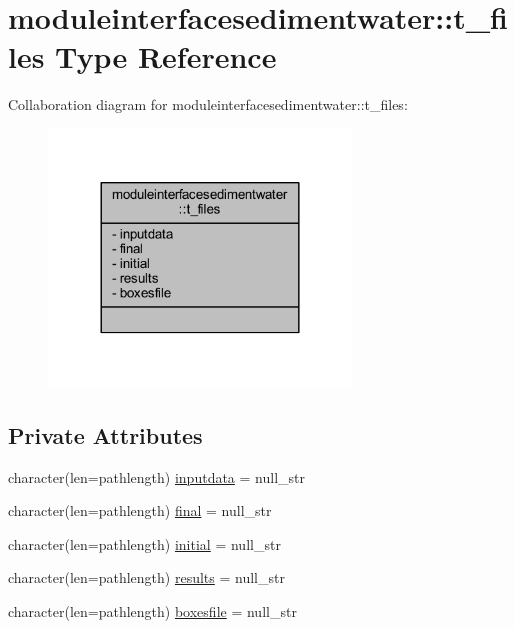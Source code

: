 \hypertarget{structmoduleinterfacesedimentwater_1_1t__files}{}\section{moduleinterfacesedimentwater\+:\+:t\+\_\+files Type Reference}
\label{structmoduleinterfacesedimentwater_1_1t__files}


Collaboration diagram for moduleinterfacesedimentwater\+:\+:t\+\_\+files\+:\nopagebreak
\begin{figure}[H]
\begin{center}
\leavevmode
\includegraphics[width=228pt]{structmoduleinterfacesedimentwater_1_1t__files__coll__graph}
\end{center}
\end{figure}
\subsection*{Private Attributes}
\begin{DoxyCompactItemize}
\item 
character(len=pathlength) \mbox{\hyperlink{structmoduleinterfacesedimentwater_1_1t__files_a0863fb6401802926bb1c729d95df47df}{inputdata}} = null\+\_\+str
\item 
character(len=pathlength) \mbox{\hyperlink{structmoduleinterfacesedimentwater_1_1t__files_a4539d8c564e231aae887ab3b7347708e}{final}} = null\+\_\+str
\item 
character(len=pathlength) \mbox{\hyperlink{structmoduleinterfacesedimentwater_1_1t__files_a06df41ee65cf1d8ec3695e1a50fcff9a}{initial}} = null\+\_\+str
\item 
character(len=pathlength) \mbox{\hyperlink{structmoduleinterfacesedimentwater_1_1t__files_abc4ad069042a82eac98587cb8b60711e}{results}} = null\+\_\+str
\item 
character(len=pathlength) \mbox{\hyperlink{structmoduleinterfacesedimentwater_1_1t__files_aab6401e4c633fdc02a345ba3fb80bdaf}{boxesfile}} = null\+\_\+str
\end{DoxyCompactItemize}


